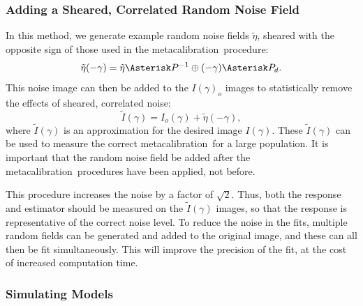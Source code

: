 \documentclass[usegraphicx,usenatbib]{mn2e}
\newcommand{\mcal}{metacalibration}
\begin{document}
\subsubsection{Adding a Sheared, Correlated Random Noise Field}

In this method, we generate example random noise fields $\tilde{\eta}$, sheared
with the opposite sign of those used in the \mcal\ procedure:
\begin{equation}
    \tilde{\eta}(-\gamma) = \tilde{\eta} \Asterisk P^{-1} \oplus (-\gamma) \Asterisk P_{d}.
\end{equation}
This noise image can then be added to the $I(\gamma)_o$ images to
statistically remove the effects of sheared, correlated noise:
\begin{equation}
    \tilde{I}(\gamma) = I_o(\gamma) + \tilde{\eta}(-\gamma),
\end{equation}
where $\tilde{I}(\gamma)$ is an approximation for the desired image
$I(\gamma)$.    These $\tilde{I}(\gamma)$
can be used to measure the correct \mcal\ for a large population.
It is important that the random noise field be added after
the \mcal\ procedures have been applied, not before.

This procedure increases the noise by a factor of $\sqrt 2$.  Thus, both the
response and estimator should be measured on the $\tilde{I}(\gamma)$ images, so
that the response is representative of the correct noise level.  To reduce the
noise in the fits, multiple random fields can be generated and added to the
original image, and these can all then be fit simultaneously.  This will
improve the precision of the fit, at the cost of increased computation time.


\subsubsection{Simulating Models}
\end{document}
